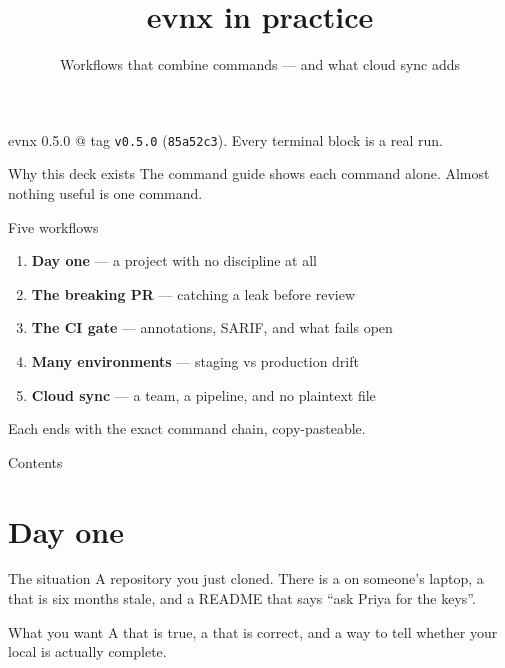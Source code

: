 \documentclass[aspectratio=169,10pt]{beamer}
\title{evnx in practice}
\subtitle{Workflows that combine commands --- and what cloud sync adds}
\date{}
\begin{document}
\begin{frame}[plain]
  \titlepage
  \begin{center}\footnotesize
  \textcolor{evnxMuted}{evnx 0.5.0 @ tag \texttt{v0.5.0} (\texttt{85a52c3}). Every terminal block is a
  real run.}
  \end{center}
\end{frame}

\begin{frame}{Why this deck exists}
  The command guide shows each command alone. Almost nothing useful is one
  command.

  \vspace{0.8em}
  \begin{block}{Five workflows}
    \begin{enumerate}
      \item \textbf{Day one} — a project with no  discipline at all
      \item \textbf{The breaking PR} — catching a leak before review
      \item \textbf{The CI gate} — annotations, SARIF, and what fails open
      \item \textbf{Many environments} — staging vs production drift
      \item \textbf{Cloud sync} — a team, a pipeline, and no plaintext file
    \end{enumerate}
  \end{block}

  \vspace{0.6em}
  {\footnotesize Each ends with the exact command chain, copy-pasteable.}
\end{frame}

\begin{frame}{Contents}\tableofcontents[hideallsubsections]\end{frame}

\section{Day one}

\begin{frame}{The situation}
  A repository you just cloned. There is a  on someone's laptop, a
   that is six months stale, and a README that says
  ``ask Priya for the keys''.

  \vspace{0.8em}
  \begin{block}{What you want}
    A  that is true, a  that is correct, and
    a way to tell whether your local  is actually complete.
  \end{block}
\end{frame}
\end{document}

